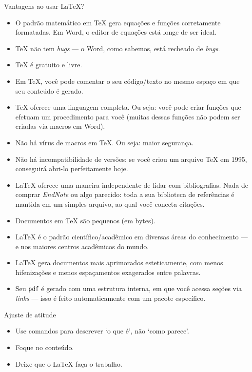 \documentclass{beamer}
\begin{document}
\begin{frame}{Vantagens ao usar \LaTeX{}?}
	\begin{itemize}\scriptsize
		\item O padrão matemático em \TeX{} gera equações e funções corretamente formatadas. Em Word, o editor de equações está longe de ser ideal.
		\item \TeX{} não tem \textit{bugs} — o Word, como sabemos, está recheado de \textit{bugs}.
		\item \TeX{} é gratuito e livre.
		\item Em \TeX{}, você pode comentar o seu código/texto no mesmo espaço em que seu conteúdo é gerado.
		\item \TeX{} oferece uma linguagem completa. Ou seja: você pode criar funções que efetuam um procedimento para você (muitas dessas funções não podem ser criadas via macros em Word).
		\item Não há vírus de macros em \TeX. Ou seja: maior segurança.
		\item Não há incompatibilidade de versões: se você criou um arquivo \TeX{} em 1995, conseguirá abri-lo perfeitamente hoje.
		\item \LaTeX{} oferece uma maneira independente de lidar com bibliografias. Nada de comprar \textit{EndNote} ou algo parecido: toda a sua biblioteca de referências é mantida em um simples arquivo, ao qual você conecta citações.
		\item Documentos em \TeX{} são pequenos (em bytes).
		\item \LaTeX{} é o padrão científico/acadêmico em diversas áreas do conhecimento — e nos maiores centros acadêmicos do mundo.
		\item \LaTeX{} gera documentos mais aprimorados esteticamente, com menos hifenizações e menos espaçamentos exagerados entre palavras.
		\item Seu \texttt{pdf} é gerado com uma estrutura interna, em que você acessa seções via \textit{links} — isso é feito automaticamente com um pacote específico.
	\end{itemize}
\end{frame}

\begin{frame}[fragile]{Ajuste de atitude}

\begin{itemize}
	\item Use comandos para descrever `o que é', não `como parece'.
	\item Foque no conteúdo.
	\item Deixe que o \LaTeX{} faça o trabalho.
\end{itemize}
\end{frame}
\end{document}
